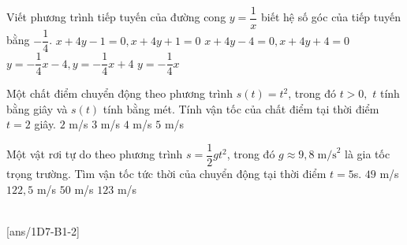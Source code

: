 \begin{ex}%
	Viết phương trình tiếp tuyến của đường cong $y=\dfrac{1}{x}$ biết hệ số góc của tiếp tuyến bằng $-\dfrac{1}{4}$. 
	\choice
	{$x+4y-1=0, x+4y+1=0$}
	{\True $x+4y-4=0, x+4y+4=0$}
	{$y=-\dfrac{1}{4}x-4, y=-\dfrac{1}{4}x+4$}
	{$y=-\dfrac{1}{4}x$}
\end{ex}

\begin{ex}%
	Một chất điểm chuyển động theo phương trình $s(t)=t^2$, trong đó $t>0,$ $t$ tính bằng giây và $s(t)$ tính bằng mét. Tính vận tốc của chất điểm tại thời điểm $t=2$ giây.
	\choice
	{$2$ m/s }
	{$3$ m/s }
	{\True $4$ m/s }
	{$5$ m/s}
\end{ex}

\begin{ex}%
	Một vật rơi tự do theo phương trình $s=\dfrac{1}{2}gt^2$, trong đó $g\approx 9,8\;\text{m/s}^2$ là gia tốc trọng trường. Tìm vận tốc tức thời của chuyển động tại thời điểm $t=5 $s.
	\choice
	{\True $49$ m/s}
	{$122,5$ m/s}
	{$50$ m/s}
	{$123$ m/s}
\end{ex}


 \\
[ans/1D7-B1-2]

